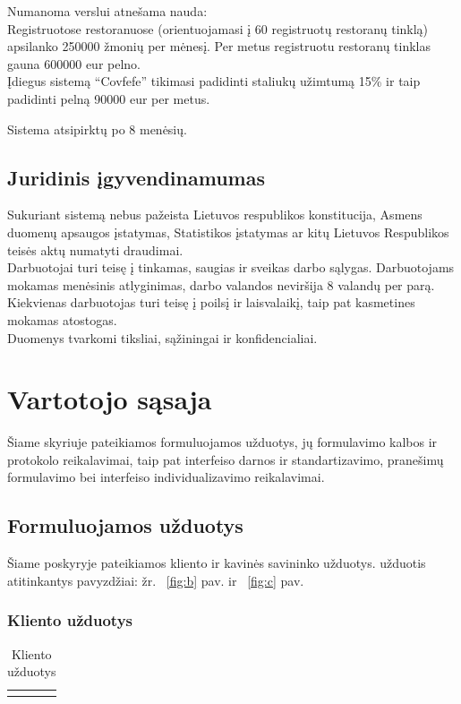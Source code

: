 \documentclass{VUMIFPSkursinis}
\begin{document}
{{{{{Numanoma verslui atnešama nauda:\\
Registruotose restoranuose (orientuojamasi į 60 registruotų restoranų tinklą) apsilanko 250000 žmonių per mėnesį. Per metus registruotu restoranų tinklas gauna 600000
eur pelno.\\
Įdiegus sistemą “Covfefe” tikimasi padidinti staliukų užimtumą 15\% ir taip padidinti
pelną 90000 eur per metus.
\hfill\break

Sistema atsipirktų po 8 menėsių. 

\subsection{Juridinis įgyvendinamumas}
Sukuriant sistemą nebus pažeista Lietuvos respublikos konstitucija, Asmens duomenų
apsaugos įstatymas, Statistikos įstatymas ar kitų Lietuvos Respublikos teisės aktų numatyti
draudimai.\\
 Darbuotojai turi teisę į tinkamas, saugias ir sveikas darbo sąlygas. Darbuotojams
mokamas menėsinis atlyginimas, darbo valandos neviršija 8 valandų per parą. Kiekvienas
darbuotojas turi teisę į poilsį ir laisvalaikį, taip pat kasmetines mokamas atostogas.\\ 
Duomenys tvarkomi tiksliai, sąžiningai ir konfidencialiai.
\break


\section{Vartotojo sąsaja}
Šiame skyriuje pateikiamos formuluojamos užduotys, jų formulavimo kalbos ir protokolo reikalavimai, taip pat interfeiso darnos ir standartizavimo, pranešimų formulavimo bei interfeiso individualizavimo reikalavimai.
 
\subsection{Formuluojamos užduotys}
Šiame poskyryje pateikiamos kliento ir kavinės savininko užduotys. užduotis atitinkantys pavyzdžiai: žr. ~\ref{fig:b} pav. ir ~\ref{fig:c} pav.
\subsubsection{Kliento užduotys}
\begin{center}
	\begin{table}[H]
	\caption{Kliento užduotys}
	\begin{tabular}{|p{2cm}|p{}|p{}|}
	\hline
	    \rowcolor{lightgray}
		\multicolumn{3}{|c|}{Kliento užduotys}\\
		

\end{tabular}
\end{table}
\end{center}}}}}}
\end{document}
